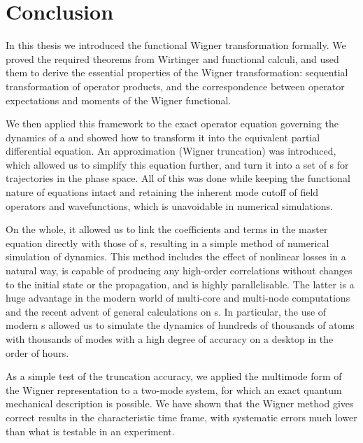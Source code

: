 \chapter{Conclusion}
\label{cha:conclusion}

In this thesis we introduced the functional Wigner transformation formally.
We proved the required theorems from Wirtinger and functional calculi, and used them to derive the essential properties of the Wigner transformation: sequential transformation of operator products, and the correspondence between operator expectations and moments of the Wigner functional.

We then applied this framework to the exact operator equation governing the dynamics of a  and showed how to transform it into the equivalent partial differential equation.
An approximation (Wigner truncation) was introduced, which allowed us to simplify this equation further, and turn it into a set of s for trajectories in the phase space.
All of this was done while keeping the functional nature of equations intact and retaining the inherent mode cutoff of field operators and wavefunctions, which is unavoidable in numerical simulations.

On the whole, it allowed us to link the coefficients and terms in the master equation directly with those of s, resulting in a simple method of numerical simulation of  dynamics.
This method includes the effect of nonlinear losses in a natural way, is capable of producing any high-order correlations without changes to the initial state or the propagation, and is highly parallelisable.
The latter is a huge advantage in the modern world of multi-core and multi-node computations and the recent advent of general calculations on s.
In particular, the use of modern s allowed us to simulate the dynamics of hundreds of thousands of atoms with thousands of modes with a high degree of accuracy on a desktop in the order of hours.

As a simple test of the truncation accuracy, we applied the multimode form of the Wigner representation to a two-mode system, for which an exact quantum mechanical description is possible.
We have shown that the Wigner method gives correct results in the characteristic time frame, with systematic errors much lower than what is testable in an experiment.

